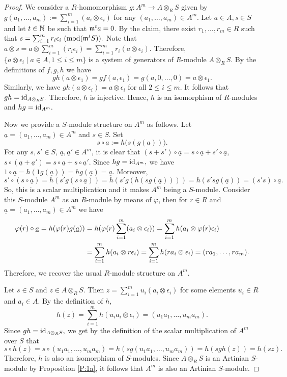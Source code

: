 \documentclass[a4papersize]{article}
\begin{document}
\begin{proof}
We consider a $R$-homomorphism $g: A^m\rightarrow A\otimes_RS$  given by $g(a_1, \ldots , a_m):=\sum_{i=1}^m(a_i\otimes\epsilon_i)$ for any $(a_1, \ldots , a_m)\in A^m$. Let $a\in A, s\in S$ and let  $t\in\Bbb N$ be such that $\frak m^ta=0$.  By the claim, there exist $r_1, \ldots , r_m\in R$ such that $s=\sum_{i=1}^m r_i\epsilon_i\ ({\rm mod}(\frak m^tS)).$ Note that 
$a\otimes s=a\otimes \sum_{i=1}^m (r_i\epsilon_i)=\sum_{i=1}^m r_i(a\otimes \epsilon_i).$ Therefore,  $\{a\otimes \epsilon_i\mid a\in A, 1\leq i\leq m\}$ is a system of generators of $R$-module $A\otimes_R S$. By the definitions of $f, g, h$ we have 
$$gh(a\otimes \epsilon_1)=gf(a,\epsilon_1)=g(a,0, \ldots ,0)=a\otimes\epsilon_1.$$ Similarly, we have $gh(a\otimes \epsilon_i)=a\otimes\epsilon_i$ for all $2\leq i\leq m.$ It follows that $gh={\rm id}_{A\otimes_RS}.$ Therefore, $h$ is injective. Hence, $h$ is an isomorphism of $R$-modules and $hg={\rm id}_{A^m}.$ 

Now we provide a  $S$-module structure on $A^m$ as follows. Let $\underline a=(a_1, \ldots , a_m)\in A^m$ and $s\in S.$  Set $$s\circ\underline a:=h\big(s(g(\underline a))\big).$$
For any $s, s'\in S$, $\underline a, \underline a'\in A^m$, it is clear that $(s+s')\circ\underline a=s\circ\underline a+s'\circ\underline a$, $s\circ(\underline a+\underline a')=s\circ\underline a +s\circ\underline a'$. Since $hg={\rm id}_{A^m},$ we have $1\circ\underline a=h(1g(\underline a))=hg(\underline a)=\underline a.$ Moreover, 
$$s'\circ(s\circ\underline a)=h(s'g(s\circ\underline a))=h(s'g(h(sg(\underline a))))=h(s'sg(\underline a))=(s's)\circ\underline a.$$ So, this is a scalar multiplication and it makes $A^m$ being a $S$-module. Consider this $S$-module $A^m$ as an $R$-module by means of $\varphi$, then for $r\in R$ and $\underline a=(a_1, \ldots , a_m)\in A^m$ we have  
\begin{align}\varphi(r)\circ\underline a=h(\varphi(r)g(\underline a))&=h(\varphi(r)\sum_{i=1}^m(a_i\otimes\epsilon_i))=\sum_{i=1}^m h(a_i\otimes \varphi(r)\epsilon_i)\notag\\
&=\sum_{i=1}^m h(a_i\otimes r\epsilon_i)=\sum_{i=1}^m h(ra_i\otimes \epsilon_i)=(ra_1, \ldots , ra_m).\notag\end{align} Therefore, we recover the usual $R$-module structure on $A^m$. 

Let $s\in S$ and $z\in A\otimes_RS.$ Then $\displaystyle z=\sum_{i=1}^m u_i(a_i\otimes \epsilon_i)$ for some elements $u_i\in R$ and $a_i\in A$. By the definition of $h$,  $$h(z)=\sum_{i=1}^m h(u_ia_i\otimes \epsilon_i)=(u_1a_1, \ldots , u_ma_m).$$ Since $gh={\rm id}_{A\otimes_RS},$ we get by the definition of the scalar multiplication of $A^m$ over $S$ that 
 $$s\circ h(z)=s\circ (u_1a_1, \ldots , u_ma_m)=h(sg(u_1a_1, \ldots , u_ma_m))=h(sgh(z))=h(sz).$$ Therefore, $h$ is also an isomorphism of $S$-modules. Since $A\otimes_RS$ is an Artinian $S$-module by Proposition \ref{P:1a}, it follows that  $A^m$ is also an Artinian $S$-module.
\end{proof}
\end{document}
